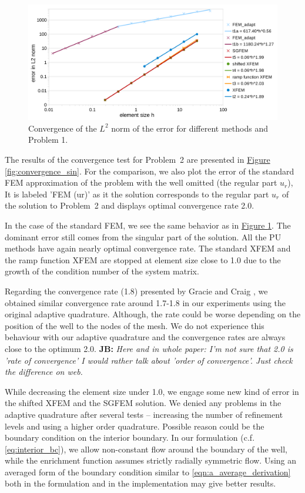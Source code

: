 \documentclass{elsarticle}
\newcommand{\prob}[1]{Problem~{#1}}
\newcommand{\fig}[1]{\hyperref[#1]{Figure \ref{#1}}}
\newcommand{\noteJB}[1]{{\color{Blue} \textbf{JB: } \textit{#1}}}
\begin{document}
\begin{figure}[!htb]
  \centering    
  \includegraphics[width=\textwidth]{results/convergence.pdf}
  \caption[Convergence graph \prob{1}]{Convergence of the $L^2$ norm of the error for different methods and Problem 1.}
  \label{fig:convergence}
\end{figure}


The results of the convergence test for \prob{2} are presented in \fig{fig:convergence_sin}.
For the comparison, we also plot the error of the standard FEM approximation of the problem with the well omitted (the regular part $u_r$), 
It is labeled 'FEM (ur)' as it the solution corresponds to the regular part $u_r$ of the solution to \prob{2} and displays optimal convergence rate 2.0.

In the case of the standard FEM, we see the same behavior as in \fig{fig:convergence}. The dominant error still 
comes from the singular part of the solution. All the PU methods have again nearly optimal convergence rate. 
The standard XFEM and the ramp function XFEM
are stopped at element size close to 1.0 due to the growth of the condition number of the system matrix.

Regarding the convergence rate (1.8) presented by Gracie and Craig \cite{gracie_modelling_2010}, we obtained similar convergence rate 
around 1.7-1.8 in our experiments using the original adaptive quadrature. Although, the rate could be worse 
depending on the position of the well to the nodes of the mesh. We do not experience this behaviour with our adaptive
quadrature and the convergence rates are always close to the optimum 2.0. \noteJB{Here and in whole paper: I'm not sure that 2.0 is 
'rate of convergence' I would rather talk about 'order of convergence'. Just check the difference on web.}

While decreasing the element size under 1.0, we engage some new kind of error in the shifted XFEM and the 
SGFEM solution. We denied any problems in the adaptive quadrature after several tests -- increasing the number
of refinement levels and using a higher order quadrature. Possible reason could be the boundary condition 
on the interior boundary. In our formulation (c.f. \eqref{eq:interior_bc}), we allow non-constant flow around the boundary
of the well, while the enrichment function assumes strictly radially symmetric flow. Using an averaged form of the boundary 
condition similar to \eqref{eqn:a_average_derivation} both in the formulation and in the implementation may give better results.
\end{document}
